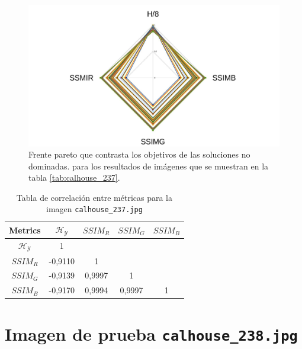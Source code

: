     \begin{figure}[H]
    \centering
    \includegraphics[width=\textwidth]{./Figures/calhouse_237/calhouse_237_2.jpg}
    \caption{Frente pareto que contrasta los objetivos de las soluciones no dominadas. para los resultados de imágenes que se muestran en la tabla \ref{tab:calhouse_237}.}
    \label{fig:calhouse2372fp}
    \end{figure}

\begin{table}[H]
\setlength{\abovecaptionskip}{2pt plus 3pt minus 2pt} %
\caption[Parámetros de entrada para $MOPSO$]{Tabla de correlación entre métricas para la imagen \texttt{calhouse\_237.jpg}}
\begin{center}
 \begin{tabular}{||c | c c c c||} 
 \hline
Metrics & $\mathscr{H_Y}$ & $SSIM_R$ & $SSIM_G$ & $SSIM_B$ \\ 
\hline
$\mathscr{H_Y}$ & 1 &  &  & \\ 
\hline
$SSIM_R$ & -0,9110 & 1 &  \\ 
\hline
$SSIM_G$ & -0,9139 & 0,9997  & 1  & \\ 
\hline
$SSIM_B$ & -0,9170 & 0,9994  & 0,9997  & 1 \\ 
\hline
\end{tabular}
\end{center}
\label{table:correlacion}
\end{table}

\section{Imagen de prueba \texttt{calhouse\_238.jpg}}

